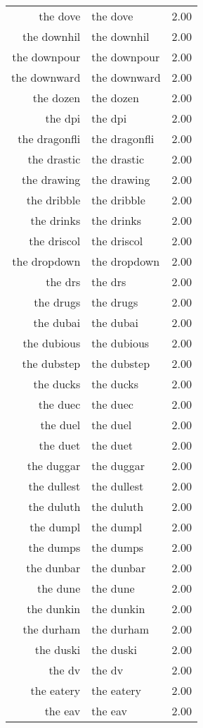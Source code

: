 \begin{table}[ht]
\begin{tabular}{rlr}
  the dove & the dove & 2.00 \\ 
  the downhil & the downhil & 2.00 \\ 
  the downpour & the downpour & 2.00 \\ 
  the downward & the downward & 2.00 \\ 
  the dozen & the dozen & 2.00 \\ 
  the dpi & the dpi & 2.00 \\ 
  the dragonfli & the dragonfli & 2.00 \\ 
  the drastic & the drastic & 2.00 \\ 
  the drawing & the drawing & 2.00 \\ 
  the dribble & the dribble & 2.00 \\ 
  the drinks & the drinks & 2.00 \\ 
  the driscol & the driscol & 2.00 \\ 
  the dropdown & the dropdown & 2.00 \\ 
  the drs & the drs & 2.00 \\ 
  the drugs & the drugs & 2.00 \\ 
  the dubai & the dubai & 2.00 \\ 
  the dubious & the dubious & 2.00 \\ 
  the dubstep & the dubstep & 2.00 \\ 
  the ducks & the ducks & 2.00 \\ 
  the duec & the duec & 2.00 \\ 
  the duel & the duel & 2.00 \\ 
  the duet & the duet & 2.00 \\ 
  the duggar & the duggar & 2.00 \\ 
  the dullest & the dullest & 2.00 \\ 
  the duluth & the duluth & 2.00 \\ 
  the dumpl & the dumpl & 2.00 \\ 
  the dumps & the dumps & 2.00 \\ 
  the dunbar & the dunbar & 2.00 \\ 
  the dune & the dune & 2.00 \\ 
  the dunkin & the dunkin & 2.00 \\ 
  the durham & the durham & 2.00 \\ 
  the duski & the duski & 2.00 \\ 
  the dv & the dv & 2.00 \\ 
  the eatery & the eatery & 2.00 \\ 
  the eav & the eav & 2.00 \\ 

\end{tabular}
\end{table}
